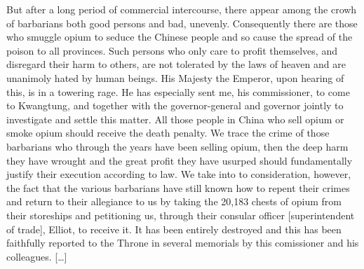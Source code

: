 \begin{fancyquote}
	[\ldots] But after a long period of commercial intercourse, there appear among the crowh of barbarians both good persons and bad, unevenly. Consequently there are those who smuggle opium to seduce the Chinese people and so cause the spread of the poison to all provinces. Such persons who only care to profit themselves, and disregard their harm to others, are not tolerated by the laws of heaven and are unanimoly hated by human beings. His Majesty the Emperor, upon hearing of this, is in a towering rage. He has especially sent me, his commissioner, to come to Kwangtung, and together with the governor-general and governor jointly to investigate and settle this matter.
	All those people in China who sell opium or smoke opium should receive the death penalty. We trace the crime of those barbarians who through the years have been selling opium, then the deep harm they have wrought and the great profit they have usurped should fundamentally justify their execution according to law. We take into to consideration, however, the fact that the various barbarians have still known how to repent their crimes and return to their allegiance to us by taking the 20,183 chests of opium from their storeships and petitioning us, through their consular officer [superintendent of trade], Elliot, to receive it. It has been entirely destroyed and this has been faithfully reported to the Throne in several memorials by this comissioner and his colleagues. [\ldots]
	\begin{flushright}
		\autocite{Teng:1979}
	\end{flushright}
\end{fancyquote}

